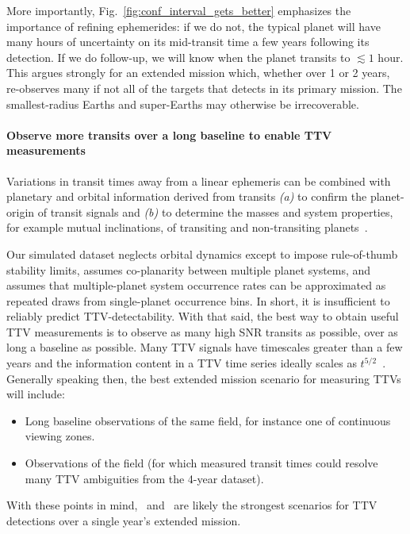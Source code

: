 More importantly, Fig.~\ref{fig:conf_interval_gets_better} emphasizes the importance of refining \tesss ephemerides: if we do not, the typical \tess planet will have many hours of uncertainty on its mid-transit time a few years following its detection.
If we do follow-up, we will know when the planet transits to $\lesssim1$ hour.
This argues strongly for an extended mission which, whether over 1 or 2 years, re-observes many if not all of the targets that \tess detects in its primary mission. 
The smallest-radius Earths and super-Earths may otherwise be irrecoverable.



\paragraph{Observe more transits over a long baseline to enable TTV measurements}
Variations in transit times away from a linear ephemeris can be combined with planetary and orbital information derived from transits \textit{(a)} to confirm the planet-origin of transit signals and \textit{(b)} to determine the masses and system properties, for example mutual inclinations, of transiting and non-transiting planets~\citep{agol_detecting_2005}.

Our simulated dataset neglects orbital dynamics except to impose rule-of-thumb stability limits, assumes co-planarity between multiple planet systems, and assumes that multiple-planet system occurrence rates can be approximated as repeated draws from single-planet occurrence bins.
In short, it is insufficient to reliably predict TTV-detectability.
With that said, the best way to obtain useful TTV measurements is to observe as many high SNR transits as possible, over as long a baseline as possible.
Many TTV signals have timescales greater than a few years
and the information content in a TTV time series ideally scales as $t^{5/2}$~\citep{fabrycky_whitepaper_2013}.
Generally speaking then, the best extended mission scenario for measuring TTVs will include:
\begin{itemize}
	\item Long baseline observations of the same field, for instance one of \tesss continuous viewing zones.
	\item Observations of the \kepler field (for which measured transit times could resolve many TTV ambiguities from the 4-year dataset).
\end{itemize}
With these points in mind, \nhemi\ and \npole\ are likely the strongest scenarios for TTV detections over a single year's extended mission.

